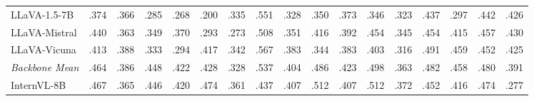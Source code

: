 \begin{table}[t]
\begin{tabular}{lcccccccccccccccc}
\quad LLaVA-1.5-7B & \cellcolor[HTML]{F7EBD9}.374 & \cellcolor[HTML]{D9EAF3}.366 & \cellcolor[HTML]{F7EBD9}.285 & \cellcolor[HTML]{F7EBD9}.268 & \cellcolor[HTML]{F7EBD9}.200 & \cellcolor[HTML]{D9EAF3}.335 & \cellcolor[HTML]{D9EAF3}.551 & \cellcolor[HTML]{F7EBD9}.328 & \cellcolor[HTML]{F7EBD9}.350 & \cellcolor[HTML]{D9EAF3}.373 & \cellcolor[HTML]{F7EBD9}.346 & \cellcolor[HTML]{D9EAF3}.323 & \cellcolor[HTML]{D9EAF3}.437 & \cellcolor[HTML]{F7EBD9}.297 & \cellcolor[HTML]{D9EAF3}.442 & \cellcolor[HTML]{D9EAF3}.426 \\
\quad LLaVA-Mistral & \cellcolor[HTML]{D9EAF3}.440 & \cellcolor[HTML]{D9EAF3}.363 & \cellcolor[HTML]{F7EBD9}.349 & \cellcolor[HTML]{D9EAF3}.370 & \cellcolor[HTML]{D9EAF3}.293 & \cellcolor[HTML]{D9EAF3}.273 & \cellcolor[HTML]{D9EAF3}.508 & \cellcolor[HTML]{D9EAF3}.351 & \cellcolor[HTML]{D9EAF3}.416 & \cellcolor[HTML]{D9EAF3}.392 & \cellcolor[HTML]{D9EAF3}.454 & \cellcolor[HTML]{D9EAF3}.345 & \cellcolor[HTML]{D9EAF3}.454 & \cellcolor[HTML]{D9EAF3}.415 & \cellcolor[HTML]{D9EAF3}.457 & \cellcolor[HTML]{D9EAF3}.430 \\
\quad LLaVA-Vicuna & \cellcolor[HTML]{D9EAF3}.413 & \cellcolor[HTML]{D9EAF3}.388 & \cellcolor[HTML]{F7EBD9}.333 & \cellcolor[HTML]{D9EAF3}.294 & \cellcolor[HTML]{D9EAF3}.417 & \cellcolor[HTML]{D9EAF3}.342 & \cellcolor[HTML]{D9EAF3}.567 & \cellcolor[HTML]{D9EAF3}.383 & \cellcolor[HTML]{F7EBD9}.344 & \cellcolor[HTML]{D9EAF3}.383 & \cellcolor[HTML]{F7EBD9}.403 & \cellcolor[HTML]{D9EAF3}.316 & \cellcolor[HTML]{D9EAF3}.491 & \cellcolor[HTML]{D9EAF3}.459 & \cellcolor[HTML]{D9EAF3}.452 & \cellcolor[HTML]{D9EAF3}.425 \\
\midrule
\rowcolor{gray!12}\textit{Backbone Mean} & \cellcolor[HTML]{D9EAF3}.464 & \cellcolor[HTML]{D9EAF3}.386 & \cellcolor[HTML]{D9EAF3}.448 & \cellcolor[HTML]{D9EAF3}.422 & \cellcolor[HTML]{D9EAF3}.428 & \cellcolor[HTML]{D9EAF3}.328 & \cellcolor[HTML]{D9EAF3}.537 & \cellcolor[HTML]{D9EAF3}.404 & \cellcolor[HTML]{D9EAF3}.486 & \cellcolor[HTML]{D9EAF3}.423 & \cellcolor[HTML]{D9EAF3}.498 & \cellcolor[HTML]{D9EAF3}.363 & \cellcolor[HTML]{D9EAF3}.482 & \cellcolor[HTML]{D9EAF3}.458 & \cellcolor[HTML]{D9EAF3}.480 & \cellcolor[HTML]{D9EAF3}.391 \\
\quad InternVL-8B & \cellcolor[HTML]{D9EAF3}.467 & \cellcolor[HTML]{D9EAF3}.365 & \cellcolor[HTML]{D9EAF3}.446 & \cellcolor[HTML]{D9EAF3}.420 & \cellcolor[HTML]{D9EAF3}.474 & \cellcolor[HTML]{D9EAF3}.361 & \cellcolor[HTML]{F7EBD9}.437 & \cellcolor[HTML]{D9EAF3}.407 & \cellcolor[HTML]{FFCCCC}.512 & \cellcolor[HTML]{D9EAF3}.407 & \cellcolor[HTML]{D9EAF3}.512 & \cellcolor[HTML]{D9EAF3}.372 & \cellcolor[HTML]{D9EAF3}.452 & \cellcolor[HTML]{D9EAF3}.416 & \cellcolor[HTML]{D9EAF3}.474 & \cellcolor[HTML]{F7EBD9}.277 \\

\end{tabular}
\end{table}
